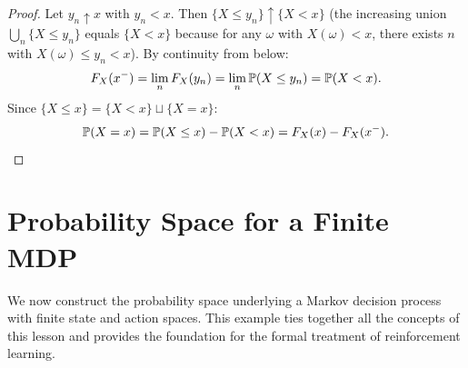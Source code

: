 \documentclass[11pt,a4paper]{article}
\begin{document}
\begin{proof}
Let $y_n \uparrow x$ with $y_n < x$. Then
$\{X \leq y_n\} \uparrow \{X < x\}$ (the increasing union
$\bigcup_n \{X \leq y_n\}$ equals $\{X < x\}$ because for any
$\omega$ with $X(\omega) < x$, there exists $n$ with
$X(\omega) \leq y_n < x$). By continuity from below:
\[
  F_X(x^-) = \lim_n F_X(y_n) = \lim_n \mathbb{P}(X \leq y_n)
  = \mathbb{P}(X < x).
\]
Since $\{X \leq x\} = \{X < x\} \sqcup \{X = x\}$:
\[
  \mathbb{P}(X = x) = \mathbb{P}(X \leq x) - \mathbb{P}(X < x)
  = F_X(x) - F_X(x^-). \qedhere
\]
\end{proof}


\section{Probability Space for a Finite MDP}
\label{sec:mdp}

We now construct the probability space underlying a Markov decision process
with finite state and action spaces. This example ties together all the
concepts of this lesson and provides the foundation for the formal
treatment of reinforcement learning.
\end{document}
